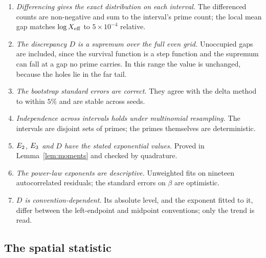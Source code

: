 \begin{enumerate}
\item[V] \emph{Differencing gives the exact distribution on each interval.} The differenced counts are non-negative and sum to the interval's prime count; the local mean gap matches $\log X_{\mathrm{eff}}$ to $5\times10^{-4}$ relative.
\item[V] \emph{The discrepancy $D$ is a supremum over the full even grid.} Unoccupied gaps are included, since the survival function is a step function and the supremum can fall at a gap no prime carries. In this range the value is unchanged, because the holes lie in the far tail.
\item[V] \emph{The bootstrap standard errors are correct.} They agree with the delta method to within $5\%$ and are stable across seeds.
\item[S] \emph{Independence across intervals holds under multinomial resampling.} The intervals are disjoint sets of primes; the primes themselves are deterministic.
\item[V] \emph{$E_2$, $E_3$ and $D$ have the stated exponential values.} Proved in Lemma~\ref{lem:moments} and checked by quadrature.
\item[L] \emph{The power-law exponents are descriptive.} Unweighted fits on nineteen autocorrelated residuals; the standard errors on $\beta$ are optimistic.
\item[L] \emph{$D$ is convention-dependent.} Its absolute level, and the exponent fitted to it, differ between the left-endpoint and midpoint conventions; only the trend is read.
\end{enumerate}

\subsection*{The spatial statistic}

